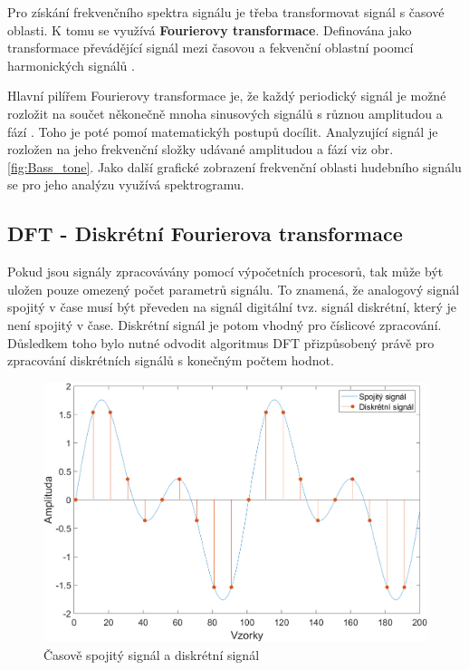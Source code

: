  Pro získání frekvenčního spektra signálu je třeba transformovat signál s časové oblasti.
  K tomu se využívá \textbf{Fourierovy transformace}.
  Definována jako transformace převádějící signál mezi časovou a fekvenční oblastní poomcí harmonických signálů .

  Hlavní pilířem Fourierovy transformace je, že každý periodický signál je možné rozložit na součet někonečně mnoha sinusových signálů s různou amplitudou a fází \cite{bracewell1978fourier}.
  Toho je poté pomoí matematickýh postupů docílit.
  Analyzující signál je rozložen na jeho frekvenční složky udávané amplitudou a fází viz obr. \ref*{fig:Bass_tone}.
  Jako další grafické zobrazení frekvenční oblasti hudebního signálu se pro jeho analýzu využívá spektrogramu.


  \subsection{DFT - Diskrétní Fourierova transformace} \label{sec:DFT}

\cite{strichartz2003guide}

  Pokud jsou signály zpracovávány pomocí výpočetních procesorů,
  tak může být uložen pouze omezený počet parametrů signálu.
  To znamená, že analogový signál spojitý v čase musí být převeden na signál digitální tvz. signál diskrétní, který je není spojitý v čase. 
  Diskrétní signál je potom vhodný pro číslicové zpracování.
  Důsledkem toho bylo nutné odvodit algoritmus \acs{DFT} přizpůsobený právě pro zpracování diskrétních signálů s konečným počtem hodnot.

  \begin{figure}[H]
    \centering
    \includegraphics[width = 0.8\linewidth]{obrazky/Discrete_signal.png}
    \caption{Časově spojitý signál a diskrétní signál}
    \label{fig:Discrete_signal}
  \end{figure}

